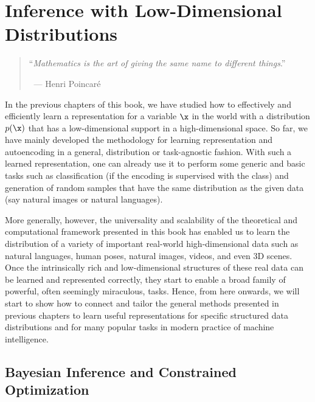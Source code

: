 \documentclass[../../book-main.tex]{subfiles}
\begin{document}
\chapter{Inference with Low-Dimensional Distributions}
\label{ch:conditional-inference}

\begin{quote}

\hfill    ``{\em Mathematics is the art of giving the same name to different things}.''

$~$ \hfill --- Henri Poincar\'e 
\end{quote}
\vspace{5mm}


In the previous chapters of this book, we have studied how to effectively and efficiently learn a representation for a variable $\x$ in the world with a distribution $p(\x)$ that has a low-dimensional support in a high-dimensional space.  So far, we have mainly developed the methodology for learning representation and autoencoding in a general, distribution or task-agnostic fashion. With such a learned representation, one can already use it to perform some generic and basic tasks such as classification (if the encoding is supervised with the class) and generation of random samples that have the same distribution as the given data (say natural images or natural languages). 

More generally, however, the universality and scalability of the theoretical and computational framework presented in this book has enabled us to learn the distribution of a variety of important real-world high-dimensional data such as natural languages, human poses, natural images, videos, and even 3D scenes. Once the intrinsically rich and low-dimensional structures of these real data can be learned and represented correctly, they start to enable a broad family of powerful, often seemingly miraculous, tasks. Hence, from here onwards, we will start to show how to connect and tailor the general methods presented in previous chapters to learn useful representations for specific structured data distributions and for many popular tasks in modern practice of machine intelligence. 

\section{Bayesian Inference and Constrained Optimization}
\end{document}
